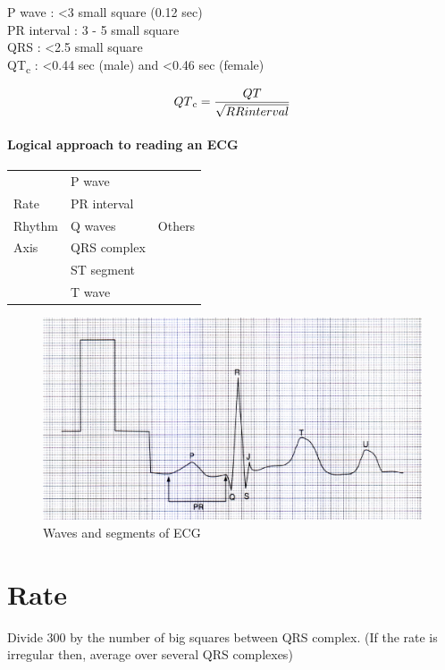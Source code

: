 \documentclass[11pt,a4paper]{report}
\begin{document}
\noindent 
P wave	 			: \textless 3 small square (0.12 sec) \\
PR interval			: 3 - 5 small square \\
QRS					: \textless 2.5 small square \\
QT\textsubscript{c}	: \textless0.44 sec (male) and \textless0.46 sec (female)

\[QT\textsubscript{c} = \frac{QT}{\sqrt{RR interval}} \]


\paragraph{Logical approach to reading an ECG}
\begin{center}
	\begin{tabular}{l|l|l} 
		\toprule[1.5pt]
		& P wave  			&  \\ 
		Rate  			& PR interval  		&  \\
		Rhythm	 		& Q waves  			&  Others \\
		Axis	 		& QRS complex 		&  \\
		& ST segment  		&  \\
		& T wave   			&  \\
		\bottomrule[1.5pt]
	\end{tabular}
\end{center}

\begin{figure}[htp]
	\centering \includegraphics[scale=.93]{ecg-parts.png}
	\centering \caption[Parts of ECG]{Waves and segments of ECG \cite{abdullah-ecg}}
	\label{ECG-parts}
\end{figure}

\section{Rate}
Divide 300 by the number of big squares between QRS complex. (If the rate is irregular then, average over several QRS complexes)\\
\end{document}
